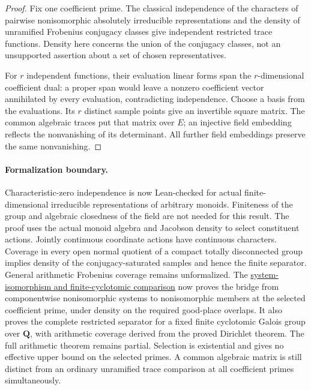 \documentclass[11pt]{article}
\theoremstyle{definition}
\theoremstyle{remark}
\newcommand{\Q}{\mathbf Q}
\begin{document}
\begin{proof}
Fix one coefficient prime. The classical independence of the characters of
pairwise nonisomorphic absolutely irreducible representations and the density
of unramified Frobenius conjugacy classes give independent restricted trace
functions. Density here concerns the union of the conjugacy classes, not an
unsupported assertion about a set of chosen representatives.

For $r$ independent functions, their evaluation linear forms span the
$r$-dimensional coefficient dual: a proper span would leave a nonzero
coefficient vector annihilated by every evaluation, contradicting independence.
Choose a basis from the evaluations. Its $r$ distinct sample points give an
invertible square matrix. The common algebraic traces put that matrix over
$E$; an injective field embedding reflects the nonvanishing of its determinant.
All further field embeddings preserve the same nonvanishing.
\end{proof}

\paragraph{Formalization boundary.}
Characteristic-zero independence is now Lean-checked for actual finite-dimensional
irreducible representations of arbitrary monoids. Finiteness of the group and
algebraic closedness of the field are not needed for this result. The proof
uses the actual monoid algebra and Jacobson density to select constituent
actions. Jointly continuous coordinate actions have continuous characters.
Coverage in every open normal quotient of a compact totally disconnected group
implies density of the conjugacy-saturated samples and hence the finite separator.
General arithmetic Frobenius coverage remains unformalized. The \hyperref[book:x-construction-25]{system-isomorphism and finite-cyclotomic comparison} now proves
the bridge from componentwise nonisomorphic systems to nonisomorphic members
at the selected coefficient prime, under density on the required good-place
overlaps. It also proves the complete restricted separator for a fixed finite
cyclotomic Galois group over $\Q$, with arithmetic coverage derived from the
proved Dirichlet theorem. The full arithmetic theorem remains partial. Selection
is existential and gives no effective upper bound on the selected primes.
A common algebraic matrix is still distinct from an ordinary unramified trace
comparison at all coefficient primes simultaneously.
\end{document}
